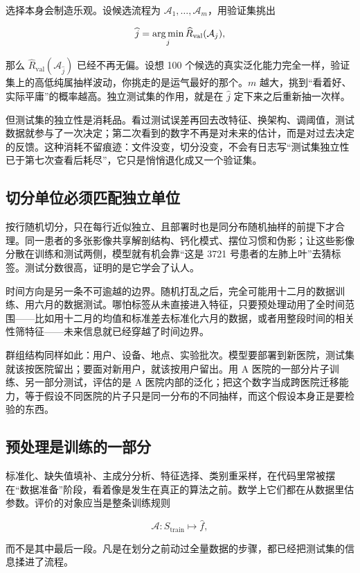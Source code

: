 选择本身会制造乐观。设候选流程为 \(\mathcal A_1,\ldots,\mathcal A_m\)，用验证集挑出

\[
\widehat j=\operatorname*{arg\,min}_j\widehat R_{\mathrm{val}}(\mathcal A_j),
\]

那么 \(\widehat R_{\mathrm{val}}(\mathcal A_{\widehat j})\) 已经不再无偏。设想 100 个候选的真实泛化能力完全一样，验证集上的高低纯属抽样波动，你挑走的是运气最好的那个。\(m\) 越大，挑到``看着好、实际平庸''的概率越高。独立测试集的作用，就是在 \(\widehat j\) 定下来之后重新抽一次样。

但测试集的独立性是消耗品。看过测试误差再回去改特征、换架构、调阈值，测试数据就参与了一次决定；第二次看到的数字不再是对未来的估计，而是对过去决定的反馈。这种消耗不留痕迹：文件没变，切分没变，不会有日志写``测试集独立性已于第七次查看后耗尽''，它只是悄悄退化成又一个验证集。

\subsection{切分单位必须匹配独立单位}

按行随机切分，只在每行近似独立、且部署时也是同分布随机抽样的前提下才合理。同一患者的多张影像共享解剖结构、钙化模式、摆位习惯和伪影；让这些影像分散在训练和测试两侧，模型就有机会靠``这是 3721 号患者的左肺上叶''去猜标签。测试分数很高，证明的是它学会了认人。

时间方向是另一条不可逾越的边界。随机打乱之后，完全可能用十二月的数据训练、用六月的数据测试。哪怕标签从未直接进入特征，只要预处理动用了全时间范围——比如用十二月的均值和标准差去标准化六月的数据，或者用整段时间的相关性筛特征——未来信息就已经穿越了时间边界。

群组结构同样如此：用户、设备、地点、实验批次。模型要部署到新医院，测试集就该按医院留出；要面对新用户，就该按用户留出。用 A 医院的一部分片子训练、另一部分测试，评估的是 A 医院内部的泛化；把这个数字当成跨医院迁移能力，等于假设不同医院的片子只是同一分布的不同抽样，而这个假设本身正是要检验的东西。

\subsection{预处理是训练的一部分}

标准化、缺失值填补、主成分分析、特征选择、类别重采样，在代码里常被摆在``数据准备''阶段，看着像是发生在真正的算法之前。数学上它们都在从数据里估参数。评价的对象应当是整条训练规则

\[
\mathcal A:S_{\mathrm{train}}\longmapsto\widehat f,
\]

而不是其中最后一段。凡是在划分之前动过全量数据的步骤，都已经把测试集的信息揉进了流程。

